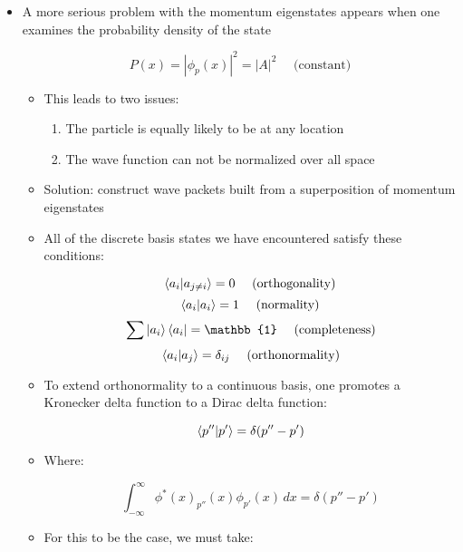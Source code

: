 \begin{itemize}
\begin{itemize}
\begin{itemize}
\begin{itemize}
            \end{itemize}

          \item A more serious problem with the momentum eigenstates appears when one examines the probability density of the state

            $$P(x)=|\phi_p(x)|^2=|A|^2\quad\text{ (constant)}$$

            \begin{itemize}

              \item This leads to two issues:

                \begin{enumerate}

                  \item The particle is equally likely to be at any location

                  \item The wave function can not be normalized over all space

                \end{enumerate}

              \item Solution: construct wave packets built from a superposition of momentum eigenstates

              \item All of the discrete basis states we have encountered satisfy these conditions:

                $$\bra{a_i}\ket{a_{j\neq i}}=0\quad\text{ (orthogonality)}$$
                $$\bra{a_i}\ket{a_{i}}=1\quad\text{ (normality)}$$
                $$\sum \ket{a_i}\bra{a_i}=\mathbb{1}\quad\text{ (completeness)}$$
                $$\bra{a_i}\ket{a_j}=\delta_{ij}\quad\text{ (orthonormality)}$$

              \item To extend orthonormality to a continuous basis, one promotes a Kronecker delta function to a Dirac delta function:

                $$\bra{p''}\ket{p'}=\delta(p''-p')$$

              \item Where:

                $$\int_{-\infty}^{\infty} \phi^*(x)_{p''}(x)\phi_{p'}(x)\,dx=\delta(p''-p')$$

              \item For this to be the case, we must take:


\end{itemize}
\end{itemize}
\end{itemize}
\end{itemize}
